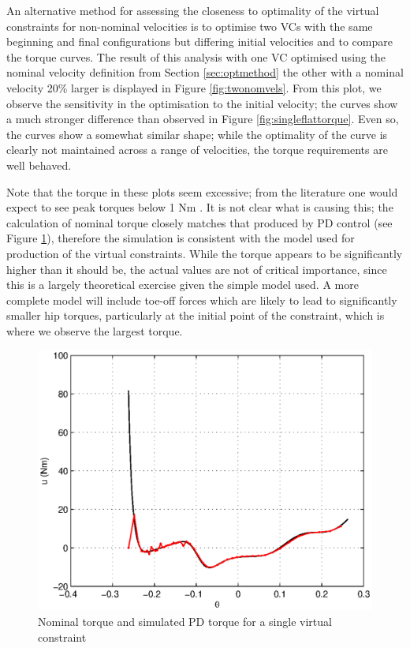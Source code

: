 An alternative method for assessing the closeness to optimality of the virtual constraints for non-nominal velocities is to optimise two VCs with the same beginning and final configurations but differing initial velocities and to compare the torque curves. The result of this analysis with one VC optimised using the nominal velocity definition from Section \ref{sec:optmethod} the other with a nominal velocity 20\% larger is displayed in Figure \ref{fig:twonomvels}. From this plot, we observe the sensitivity in the optimisation to the initial velocity; the curves show a much stronger difference than observed in Figure \ref{fig:singleflattorque}. Even so, the curves show a somewhat similar shape; while the optimality of the curve is clearly not maintained across a range of velocities, the torque requirements are well behaved.

Note that the torque in these plots seem excessive; from the literature one would expect to see peak torques below 1 Nm \cite{westervelt2007feedback, collins2005efficient}. It is not clear what is causing this; the calculation of nominal torque closely matches that produced by PD control (see Figure \ref{fig:pdmatchesnom}), therefore the simulation is consistent with the model used for production of the virtual constraints. While the torque appears to be significantly higher than it should be, the actual values are not of critical importance, since this is a largely theoretical exercise given the simple model used. A more complete model will include toe-off forces which are likely to lead to significantly smaller hip torques, particularly at the initial point of the constraint, which is where we observe the largest torque.

\begin{figure}
\centering
\includegraphics[width=0.6\linewidth]{7Results/pdmatchesnom}
\caption{Nominal torque and simulated PD torque for a single virtual constraint}
\label{fig:pdmatchesnom}
\end{figure}


